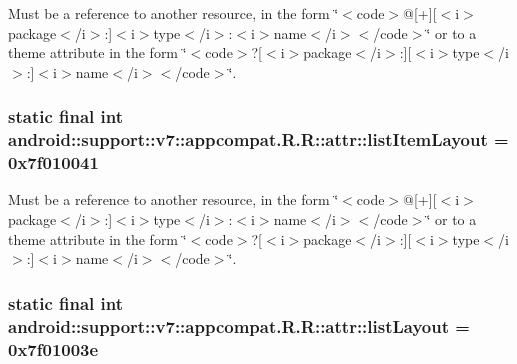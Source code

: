 Must be a reference to another resource, in the form \char`\"{}$<$code$>$@\mbox{[}+\mbox{]}\mbox{[}$<$i$>$package$<$/i$>$:\mbox{]}$<$i$>$type$<$/i$>$:$<$i$>$name$<$/i$>$$<$/code$>$\char`\"{} or to a theme attribute in the form \char`\"{}$<$code$>$?\mbox{[}$<$i$>$package$<$/i$>$:\mbox{]}\mbox{[}$<$i$>$type$<$/i$>$:\mbox{]}$<$i$>$name$<$/i$>$$<$/code$>$\char`\"{}. \hypertarget{classandroid_1_1support_1_1v7_1_1appcompat_1_1_r_1_1attr_9ceef92d5fde40b20ea8b8e018b6082f}{
\subsubsection[{listItemLayout}]{\setlength{\rightskip}{0pt plus 5cm}static final int android::support::v7::appcompat.R.R::attr::listItemLayout = 0x7f010041}}
\label{classandroid_1_1support_1_1v7_1_1appcompat_1_1_r_1_1attr_9ceef92d5fde40b20ea8b8e018b6082f}


Must be a reference to another resource, in the form \char`\"{}$<$code$>$@\mbox{[}+\mbox{]}\mbox{[}$<$i$>$package$<$/i$>$:\mbox{]}$<$i$>$type$<$/i$>$:$<$i$>$name$<$/i$>$$<$/code$>$\char`\"{} or to a theme attribute in the form \char`\"{}$<$code$>$?\mbox{[}$<$i$>$package$<$/i$>$:\mbox{]}\mbox{[}$<$i$>$type$<$/i$>$:\mbox{]}$<$i$>$name$<$/i$>$$<$/code$>$\char`\"{}. \hypertarget{classandroid_1_1support_1_1v7_1_1appcompat_1_1_r_1_1attr_954dc0e19e88ad4929bd39f2f29ed469}{
\subsubsection[{listLayout}]{\setlength{\rightskip}{0pt plus 5cm}static final int android::support::v7::appcompat.R.R::attr::listLayout = 0x7f01003e}}
\label{classandroid_1_1support_1_1v7_1_1appcompat_1_1_r_1_1attr_954dc0e19e88ad4929bd39f2f29ed469}


